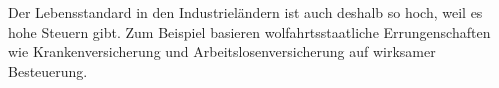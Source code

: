 Der Lebensstandard in den Industrieländern ist auch deshalb so hoch, weil es hohe Steuern gibt.
Zum Beispiel basieren wolfahrtsstaatliche Errungenschaften wie Krankenversicherung und Arbeitslosenversicherung auf wirksamer Besteuerung.